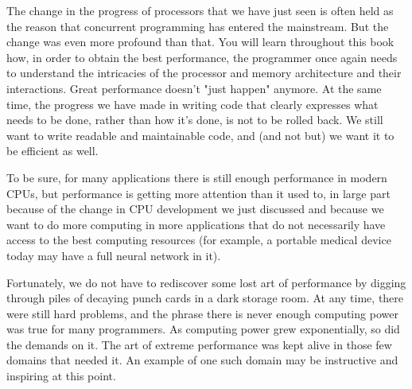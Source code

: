 The change in the progress of processors that we have just seen is often held as the reason that concurrent programming has entered the mainstream. But the change was even more profound than that. You will learn throughout this book how, in order to obtain the best performance, the programmer once again needs to understand the intricacies of the processor and memory architecture and their interactions. Great performance doesn't "just happen" anymore. At the same time, the progress we have made in writing code that clearly expresses what needs to be done, rather than how it's done, is not to be rolled back. We still want to write readable and maintainable code, and (and not but) we want it to be efficient as well.

To be sure, for many applications there is still enough performance in modern CPUs, but performance is getting more attention than it used to, in large part because of the change in CPU development we just discussed and because we want to do more computing in more applications that do not necessarily have access to the best computing resources (for example, a portable medical device today may have a full neural network in it).

Fortunately, we do not have to rediscover some lost art of performance by digging through piles of decaying punch cards in a dark storage room. At any time, there were still hard problems, and the phrase there is never enough computing power was true for many programmers. As computing power grew exponentially, so did the demands on it. The art of extreme performance was kept alive in those few domains that needed it. An example of one such domain may be instructive and inspiring at this point.











